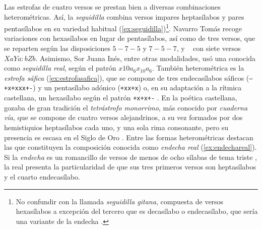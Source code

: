 Las estrofas de cuatro versos se prestan bien a diversas combinaciones heterométricas. Así, la \textit{seguidilla} combina versos impares heptasílabos y pares pentasílabos en su variedad habitual (\ref{ex:seguidilla})\footnote{No confundir con la llamada \textit{seguidilla gitana}, compuesta de versos hexasílabos a excepción del tercero que es decasílabo o endecasílabo, que sería una variante de la endecha \parencite[185-186]{hanssen1957}.}. Navarro Tomás\parencite*[292-293]{navarrotomas1991} recoge variaciones con hexasílabos en lugar de pentasílabos, así como de tres versos, que se reparten según las disposiciones $5-7-5$ y $7-5-7$, y \citeauthor{morley1968}~\parencite*{morley1968} con siete versos $XaYa:bZb$. Asimismo, Sor Juana Inés, entre otras modalidades, usó una conocida como \textit{seguidilla real}, según el patrón $x{10}a_6x_{10}a_6$. También heterométrica es la \textit{estrofa sáfica} (\ref{ex:estrofasafica}), que se compone de tres endecasílabos sáficos  (\texttt{---+x+xxx+-}) y un pentasílabo adónico (\texttt{+xx+x}) o, en su adaptación a la rítmica castellana, un hexasílabo según el patrón \texttt{+x+x+-} \parencite[119]{luque2010}. En la poética castellana, gozaba de gran tradición el \textit{tetrástrofo monorrimo}, más conocido por \textit{cuaderna vía}, que se compone de cuatro versos alejandrinos, a su vez formados por dos hemistiquios heptasílabos cada uno, y una sola rima consonante, pero su presencia es escasa en el Siglo de Oro \parencite[277]{navarrotomas1991}. Entre las formas heterométricas destacan las que constituyen la composición conocida como \textit{endecha real}  (\ref{ex:endechareal}). Si la \textit{endecha} es un romancillo de versos de menos de ocho sílabas de tema triste \parencite[\textit{s.v.} \textit{endecha}]{dominguez1985}, la real presenta la particularidad de que sus tres primeros versos son heptasílabos y el cuarto endecasílabo.


